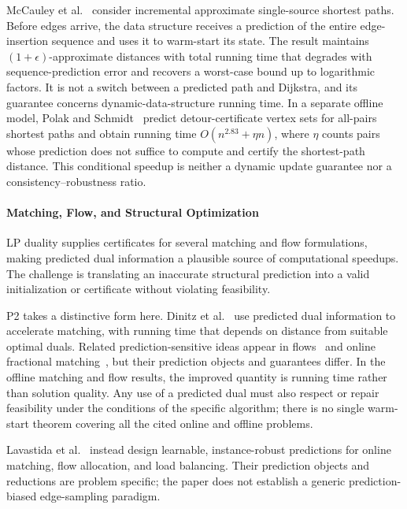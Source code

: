 \documentclass[acmsmall,screen,nonacm]{acmart}
\theoremstyle{acmdefinition}%
\begin{document}
McCauley et al.~\cite{mccauley2025sssp} consider incremental approximate single-source shortest paths. Before edges arrive, the data structure receives a prediction of the entire edge-insertion sequence and uses it to warm-start its state. The result maintains $(1+\epsilon)$-approximate distances with total running time that degrades with sequence-prediction error and recovers a worst-case bound up to logarithmic factors. It is not a switch between a predicted path and Dijkstra, and its guarantee concerns dynamic-data-structure running time. In a separate offline model, Polak and Schmidt~\cite{polak2026apsp} predict detour-certificate vertex sets for all-pairs shortest paths and obtain running time $O(n^{2.83}+\eta n)$, where $\eta$ counts pairs whose prediction does not suffice to compute and certify the shortest-path distance. This conditional speedup is neither a dynamic update guarantee nor a consistency--robustness ratio.

\paragraph{Matching, Flow, and Structural Optimization}
LP duality supplies certificates for several matching and flow formulations, making predicted dual information a plausible source of computational speedups. The challenge is translating an inaccurate structural prediction into a valid initialization or certificate without violating feasibility.

P2 takes a distinctive form here. Dinitz et al.~\cite{dinitz2021duals} use predicted dual information to accelerate matching, with running time that depends on distance from suitable optimal duals. Related prediction-sensitive ideas appear in flows~\cite{davies2023flows} and online fractional matching~\cite{choo2025fractional}, but their prediction objects and guarantees differ. In the offline matching and flow results, the improved quantity is running time rather than solution quality. Any use of a predicted dual must also respect or repair feasibility under the conditions of the specific algorithm; there is no single warm-start theorem covering all the cited online and offline problems.

Lavastida et al.~\cite{lavastida2021instancerobust} instead design learnable, instance-robust predictions for online matching, flow allocation, and load balancing. Their prediction objects and reductions are problem specific; the paper does not establish a generic prediction-biased edge-sampling paradigm.
\end{document}
